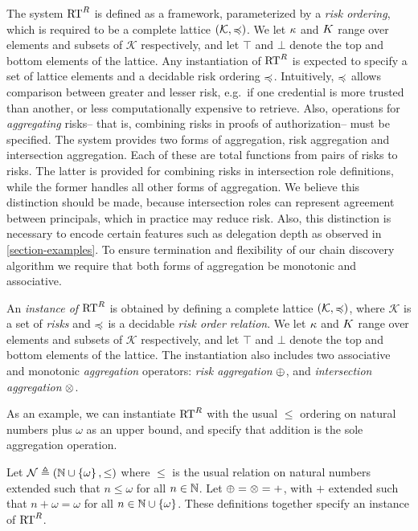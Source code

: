 The system $\text{RT}^R$ is defined as a framework, parameterized by a
\emph{risk ordering}, which is required to be a complete lattice
$(\mathcal{K},\preccurlyeq)$.  We let $\kappa$ and $K$ range over elements
and subsets of $\mathcal{K}$ respectively, and let $\top$ and $\bot$
denote the top and bottom elements of the lattice.  Any instantiation
of $\text{RT}^R$ is expected to specify a set of lattice elements and a
decidable risk ordering $\preccurlyeq$.  Intuitively, $\preccurlyeq$ allows comparison
between greater and lesser risk, e.g.~if one credential is more
trusted than another, or less computationally expensive to retrieve.
Also, operations for \emph{aggregating} risks-- that is, combining
risks in proofs of authorization-- must be specified.  The system
provides two forms of aggregation, risk aggregation and intersection
aggregation.  Each of these are total functions from pairs of risks to
risks.  The latter is provided for combining risks in intersection
role definitions, while the former handles all other forms of
aggregation.  We believe this distinction should be made, because
intersection roles can represent agreement between principals, which
in practice may reduce risk.  Also, this distinction is necessary to
encode certain features such as delegation depth as observed in
\autoref{section-examples}.  To ensure termination and flexibility of
our chain discovery algorithm we require that both forms of
aggregation be monotonic and associative.
\begin{definition}
An \emph{instance of $\text{RT}^R$} is obtained by defining a complete
lattice $(\mathcal{K},\preccurlyeq)$, where $\mathcal{K}$ is a set of
\emph{risks} and $\preccurlyeq$ is a decidable \emph{risk order relation}.  We
let $\kappa$ and $K$ range over elements and subsets of
$\mathcal{K}$ respectively, and let $\top$ and $\bot$ denote the top
and bottom elements of the lattice.  The instantiation also includes
two associative and monotonic \emph{aggregation}
operators: \emph{risk aggregation} $\oplus$,
and \emph{intersection aggregation} $\otimes$.
\end{definition}
As an example, we can instantiate $\text{RT}^R$ with the usual $\le$ 
ordering on natural numbers plus $\omega$ as an upper bound,
and specify that addition is the sole aggregation operation.
\begin{example}
\label{example-ponat}
Let $\mathcal{N} \triangleq (\mathbb{N} \cup \left\{\omega\right\}, \le)$ where $\le$ is
the usual relation on natural numbers extended such that $n \le
\omega$ for all $n \in \mathbb{N}$.  Let $\oplus = \otimes = +$,
with $+$ extended such that $n + \omega = \omega$ for all $n \in \mathbb{N} \cup
\left\{\omega\right\}$.  
These definitions together specify an instance of $\text{RT}^R$.
\end{example}

